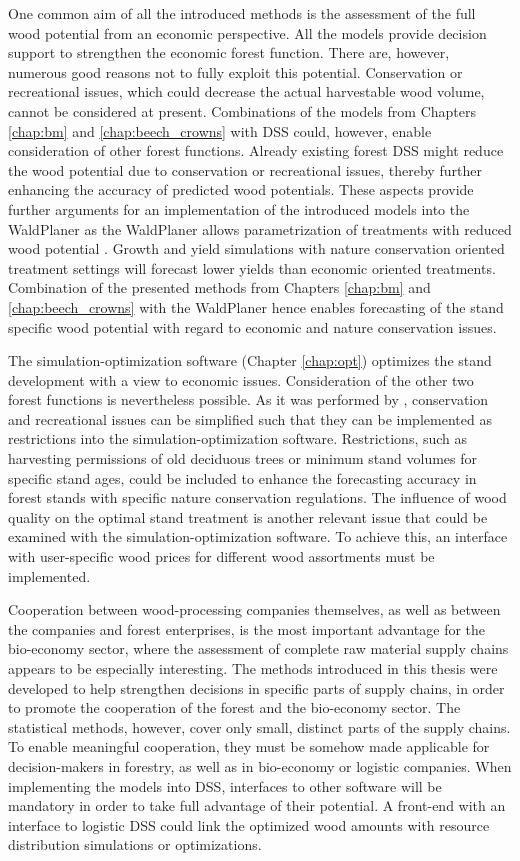 One common aim of all the introduced methods is the assessment of the full wood potential from an economic perspective. All the models provide decision support to strengthen the economic forest function. There are, however, numerous good reasons not to fully exploit this potential. Conservation or recreational issues, which could decrease the actual harvestable wood volume, cannot be considered at present. Combinations of the models from Chapters \ref{chap:bm} and \ref{chap:beech_crowns} with DSS could, however, enable consideration of other forest functions. Already existing forest DSS might reduce the wood potential due to conservation or recreational issues, thereby further enhancing the accuracy of predicted wood potentials. These aspects provide further arguments for an implementation of the introduced models into the WaldPlaner as the WaldPlaner allows parametrization of treatments with reduced wood potential \citep[p. 90-93]{hansen_2014}. Growth and yield simulations with nature conservation oriented treatment settings will forecast lower yields than economic oriented treatments. Combination of the presented methods from Chapters \ref{chap:bm} and \ref{chap:beech_crowns} with the WaldPlaner hence enables forecasting of the stand specific wood potential with regard to economic and nature conservation issues.

The si\-mu\-la\-tion-op\-ti\-mi\-za\-tion software (Chapter \ref{chap:opt}) optimizes the stand development with a view to economic issues. Consideration of the other two forest functions is nevertheless possible. As it was performed by \citet{yousefpour_2009}, conservation and recreational issues can be simplified such that they can be implemented as restrictions into the si\-mu\-la\-tion-op\-ti\-mi\-za\-tion software. Restrictions, such as harvesting permissions of old deciduous trees or minimum stand volumes for specific stand ages, could be included to enhance the forecasting accuracy in forest stands with specific nature conservation regulations. The influence of wood quality on the optimal stand treatment is another relevant issue that could be examined with the si\-mu\-la\-tion-op\-ti\-mi\-za\-tion software. To achieve this, an interface with user-specific wood prices for different wood assortments must be implemented.

Cooperation between wood-processing companies themselves, as well as between the companies and forest enterprises, is the most important advantage for the bio-economy sector, where the assessment of complete raw material supply chains appears to be especially interesting. The methods introduced in this thesis were developed to help strengthen decisions in specific parts of supply chains, in order to promote the cooperation of the forest and the bio-economy sector. The statistical methods, however, cover only small, distinct parts of the supply chains. To enable meaningful cooperation, they must be somehow made applicable for decision-makers in forestry, as well as in bio-economy or logistic companies. When implementing the models into DSS, interfaces to other software will be mandatory in order to take full advantage of their potential. A front-end with an interface to logistic DSS could link the optimized wood amounts with resource distribution simulations or optimizations.